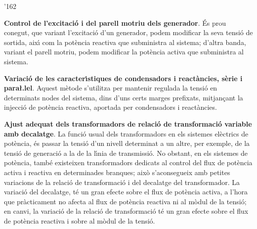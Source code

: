 \begin{dinglist}{'162}
   \item \textbf{Control de l'excitaci\'{o} i del parell motriu dels generador}. \'{E}s prou conegut,
    que variant l'excitaci\'{o} d'un generador, podem modificar la seva tensi\'{o} de sortida, aix\'{\i} com
    la pot\`{e}ncia reactiva que subministra al sistema; d'altra banda, variant el parell motriu,
    podem modificar la pot\`{e}ncia activa que subministra al sistema.
   \item \textbf{Variaci\'{o} de les caracter\'{\i}stiques de condensadors i react\`{a}ncies, s\`{e}rie
    i para{\l.l}el}. Aquest m\`{e}tode s'utilitza per mantenir regulada la tensi\'{o} en determinats
     nodes del sistema, dins d'uns certs marges prefixats, mitjan\c{c}ant la injecci\'{o}  de pot\`{e}ncia
      reactiva, aportada per condensadors i react\`{a}ncies.
   \item \textbf{Ajust adequat dels transformadors de relaci\'{o} de transformaci\'{o} variable amb
    decalatge}. La funci\'{o} usual dels transformadors en els sistemes el\`{e}ctrics de pot\`{e}ncia,
    \'{e}s passar la tensi\'{o} d'un nivell determinat a un altre, per exemple, de la tensi\'{o} de generaci\'{o}
    a la de la l\'{\i}nia de transmissi\'{o}. No obstant, en els sistemes de pot\`{e}ncia, tamb\'{e} existeixen
    transformadors dedicats al control del flux de pot\`{e}ncia activa i reactiva en determinades
    branques; aix\`{o} s'aconsegueix amb petites variacions de la relaci\'{o} de transformaci\'{o} i del
    decalatge del transformador. La variaci\'{o} del decalatge, t\'{e} un gran efecte sobre el flux
    de pot\`{e}ncia activa, a l'hora que pr\`{a}cticament no afecta al flux de pot\`{e}ncia reactiva ni al
    m\`{o}dul de la tensi\'{o}; en canvi, la variaci\'{o} de la relaci\'{o} de transformaci\'{o} t\'{e} un gran efecte
    sobre el flux de pot\`{e}ncia reactiva i sobre al m\`{o}dul de la tensi\'{o}.
\end{dinglist}
